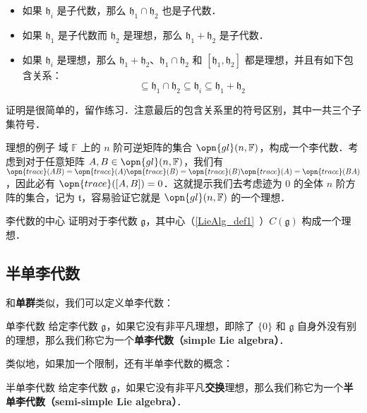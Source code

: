 \begin{itemize}
\item 如果 $\mathfrak{h}_i$ 是子代数，那么 $\mathfrak{h}_1\cap\mathfrak{h}_2$ 也是子代数．
\item 如果 $\mathfrak{h}_1$ 是子代数而 $\mathfrak{h}_2$ 是理想，那么 $\mathfrak{h}_1+\mathfrak{h}_2$ 是子代数．
\item 如果 $\mathfrak{h}_i$ 是理想，那么 $\mathfrak{h}_1+\mathfrak{h}_2$、$\mathfrak{h}_1\cap\mathfrak{h}_2$ 和 $[\mathfrak{h}_1, \mathfrak{h}_2]$ 都是理想，并且有如下包含关系：\begin{equation}
[\mathfrak{h}_1, \mathfrak{h}_2]\subseteq\mathfrak{h}_1\cap\mathfrak{h}_2\subseteq\mathfrak{h}_i\subseteq\mathfrak{h}_1+\mathfrak{h}_2
\end{equation}

\end{itemize}

证明是很简单的，留作练习．注意最后的包含关系里的符号区别，其中一共三个子集符号．

\begin{example}{理想的例子}
域 $\mathbb{F}$ 上的 $n$ 阶可逆矩阵的集合 $\opn{gl}(n, \mathbb{F})$，构成一个李代数．考虑到对于任意矩阵 $A, B\in\opn{gl}(n, \mathbb{F})$，我们有 $\opn{trace}(AB)=\opn{trace}(A)\opn{trace}(B)=\opn{trace}(B)\opn{trace}(A)=\opn{trace}(BA)$，因此必有 $\opn{trace}([A, B])=0$．这就提示我们去考虑迹为 $0$ 的全体 $n$ 阶方阵的集合，记为 $\mathfrak{t}$，容易验证它就是 $\opn{gl}(n, \mathbb{F})$ 的一个理想．
\end{example}

\begin{exercise}{李代数的中心}
证明对于李代数 $\mathfrak{g}$，其中心（\autoref{LieAlg_def1}~）$C(\mathfrak{g})$ 构成一个理想．
\end{exercise}


\subsection{半单李代数}

和\textbf{单群}类似，我们可以定义单李代数：

\begin{definition}{单李代数}
给定李代数 $\mathfrak{g}$，如果它没有非平凡理想，即除了 $\{0\}$ 和 $\mathfrak{g}$ 自身外没有别的理想，那么我们称它为一个\textbf{单李代数（simple Lie algebra）}．
\end{definition}

类似地，如果加一个限制，还有半单李代数的概念：
\begin{definition}{半单李代数}
给定李代数 $\mathfrak{g}$，如果它没有非平凡\textbf{交换}理想，那么我们称它为一个\textbf{半单李代数（semi-simple Lie algebra）}．
\end{definition}





